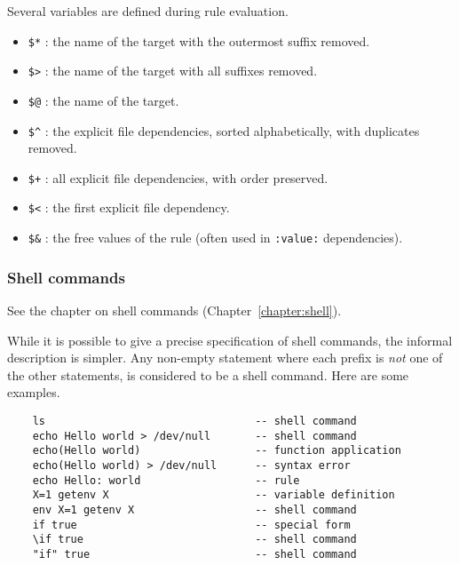Several variables are defined during rule evaluation.

\begin{itemize}
\item \verb+$*+ : the name of the target with the outermost suffix removed.
\item \verb+$>+ : the name of the target with all suffixes removed.
\item \verb+$@+ : the name of the target.
\item \verb+$^+ : the explicit file dependencies, sorted alphabetically, with duplicates removed.
\item \verb.$+. : all explicit file dependencies, with order preserved.
\item \verb+$<+ : the first explicit file dependency.
\item \verb+$&+ : the free values of the rule (often used in \verb+:value:+ dependencies).
\end{itemize}

\subsubsection{Shell commands}

See the chapter on shell commands (Chapter~\ref{chapter:shell}).

While it is possible to give a precise specification of shell commands, the informal description is
simpler.  Any non-empty statement where each prefix is \emph{not} one of the other statements, is
considered to be a shell command.  Here are some examples.

\begin{verbatim}
    ls                                 -- shell command
    echo Hello world > /dev/null       -- shell command
    echo(Hello world)                  -- function application
    echo(Hello world) > /dev/null      -- syntax error
    echo Hello: world                  -- rule
    X=1 getenv X                       -- variable definition
    env X=1 getenv X                   -- shell command
    if true                            -- special form
    \if true                           -- shell command
    "if" true                          -- shell command
\end{verbatim}
    

